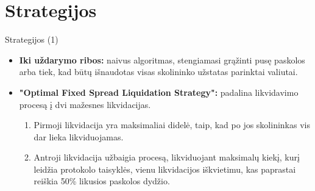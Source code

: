 \documentclass[12pt]{beamer}
\begin{document}
\section{Strategijos}
\begin{frame}{Strategijos (1)}
  \begin{itemize}
    \item \textbf{Iki uždarymo ribos:} naivus algoritmas, stengiamasi grąžinti pusę paskolos arba tiek, kad būtų išnaudotas visas skolininko užstatas parinktai valiutai.
    \item \textbf{"Optimal Fixed Spread Liquidation Strategy":} padalina likvidavimo procesą į dvi mažesnes likvidacijas. %
    \begin{enumerate}
    \item Pirmoji likvidacija yra maksimaliai didelė, taip, kad po jos skolininkas vis dar lieka likviduojamas.
    \item Antroji likvidacija užbaigia procesą, likviduojant maksimalų kiekį, kurį leidžia protokolo taisyklės, vienu likvidacijos iškvietimu, kas paprastai reiškia 50\% likusios paskolos dydžio.
    \end{enumerate}
  \end{itemize}
\end{frame}
\end{document}
